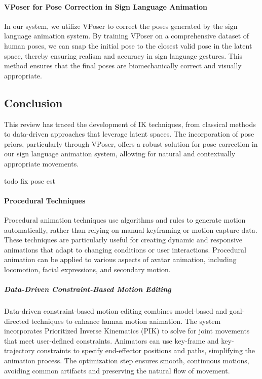 \documentclass[../../main.tex]{subfiles}
\begin{document}
\paragraph{VPoser for Pose Correction in Sign Language Animation} In our system, we utilize VPoser to correct the poses generated by the sign language animation system. By training VPoser on a comprehensive dataset of human poses, we can snap the initial pose to the closest valid pose in the latent space, thereby ensuring realism and accuracy in sign language gestures. This method ensures that the final poses are biomechanically correct and visually appropriate.

\subsection{Conclusion}
\label{ch:pose_correction:related_work:conclusion}
This review has traced the development of IK techniques, from classical methods to data-driven approaches that leverage latent spaces. The incorporation of pose priors, particularly through VPoser, offers a robust solution for pose correction in our sign language animation system, allowing for natural and contextually appropriate movements.


todo fix pose est

\paragraph{Procedural Techniques}
\label{ch:background_work:sign_language_synthesis:3d_techniques:avatar_animation:procedural_techniques}

Procedural animation techniques use algorithms and rules to generate motion automatically, rather than relying on manual keyframing or motion capture data. These techniques are particularly useful for creating dynamic and responsive animations that adapt to changing conditions or user interactions. Procedural animation can be applied to various aspects of avatar animation, including locomotion, facial expressions, and secondary motion.

\subparagraph{Data-Driven Constraint-Based Motion Editing}
\label{ch:background_work:sign_language_synthesis:3d_techniques:avatar_animation:procedural_techniques:data_driven_constraint_based_motion_editing}

Data-driven constraint-based motion editing\cite{inbook} combines model-based and goal-directed techniques to enhance human motion animation. The system incorporates Prioritized Inverse Kinematics (PIK) to solve for joint movements that meet user-defined constraints. Animators can use key-frame and key-trajectory constraints to specify end-effector positions and paths, simplifying the animation process. The optimization step ensures smooth, continuous motions, avoiding common artifacts and preserving the natural flow of movement.
\end{document}
